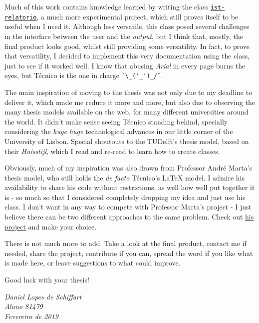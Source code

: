 \documentclass[english]{../ist-thesis}
\begin{document}
Much of this work contains knowledge learned by writing the class \href{https://github.com/ekspek/ist-relatorio}{\texttt{ist-relatorio}}, a much more experimental project, which still proves itself to be useful when I need it. Although less versatile, this class posed several challenges in the interface between the user and the \textit{output}, but I think that, mostly, the final product looks good, whilst still providing some versatility. In fact, to prove that versatility, I decided to implement this very documentation using the class, just to see if it worked well. I know that abusing \textit{Arial} in every page burns the eyes, but Técnico is the one in charge \verb|¯\_('_')_/¯|.

The main inspiration of moving to the thesis was not only due to my deadline to deliver it, which made me reduce it more and more, but also due to observing the many thesis models available on the web, for many different universities around the world. It didn't make sense seeing Técnico standing behind, specially considering the \textit{huge huge} technological advances in our little corner of the University of Lisbon. Special shoutouts to the TUDelft's thesis model, based on their \textit{Huisstijl}, which I read and re-read to learn how to create classes.

Obviously, much of my inspiration was also drawn from Professor André Marta's thesis model, who still holds the \textit{ de facto} Técnico's \LaTeX{} model. I admire his availability to share his code without restrictions, as well how well put together it is - so much so that I considered completely dropping my idea and just use his class. I don't want in any way to compete with Professor Marta's project - I just believe there can be two different approaches to the same problem. Check out \href{https://fenix.tecnico.ulisboa.pt/homepage/ist31052/documentos-para-elaboracao-da-tese}{his project} and make your choice.


There is not much more to add. Take a look at the final product, contact me if needed, share the project, contribute if you can, spread the word if you like what is made here, or leave suggestions to what could improve.

Good luck with your thesis!

\begin{flushright}\itshape
	Daniel Lopes de Schiffart \\
	Aluno 81479 \\
	Fevereiro de 2019
\end{flushright}
\end{document}

